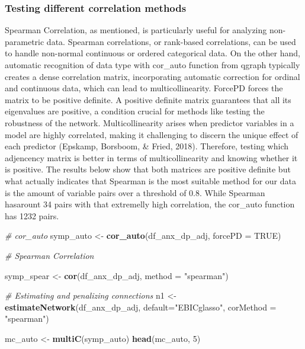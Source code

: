 \documentclass[
]{article}
\newenvironment{Shaded}{\begin{snugshade}}{\end{snugshade}}
\newcommand{\AttributeTok}[1]{\textcolor[rgb]{0.13,0.29,0.53}{#1}}
\newcommand{\CommentTok}[1]{\textcolor[rgb]{0.56,0.35,0.01}{\textit{#1}}}
\newcommand{\ConstantTok}[1]{\textcolor[rgb]{0.56,0.35,0.01}{#1}}
\newcommand{\DecValTok}[1]{\textcolor[rgb]{0.00,0.00,0.81}{#1}}
\newcommand{\FunctionTok}[1]{\textcolor[rgb]{0.13,0.29,0.53}{\textbf{#1}}}
\newcommand{\NormalTok}[1]{#1}
\newcommand{\OtherTok}[1]{\textcolor[rgb]{0.56,0.35,0.01}{#1}}
\newcommand{\StringTok}[1]{\textcolor[rgb]{0.31,0.60,0.02}{#1}}
\begin{document}
\subsubsection{Testing different correlation
methods}\label{testing-different-correlation-methods}

Spearman Correlation, as mentioned, is particularly useful for analyzing
non-parametric data. Spearman correlations, or rank-based correlations,
can be used to handle non-normal continuous or ordered categorical data.
On the other hand, automatic recognition of data type with cor\_auto
function from qgraph typically creates a dense correlation matrix,
incorporating automatic correction for ordinal and continuous data,
which can lead to multicollinearity. ForcePD forces the matrix to be
positive definite. A positive definite matrix guarantees that all its
eigenvalues are positive, a condition crucial for methods like testing
the robustness of the network. Multicollinearity arises when predictor
variables in a model are highly correlated, making it challenging to
discern the unique effect of each predictor (Epskamp, Borsboom, \&
Fried, 2018). Therefore, testing which adjencency matrix is better in
terms of multicollinearity and knowing whether it is positive. The
results below show that both matrices are positive definite but what
actually indicates that Spearman is the most suitable method for our
data is the amount of variable pairs over a threshold of 0.8. While
Spearman hasarount 34 pairs with that extremelly high correlation, the
cor\_auto function has 1232 pairs.

\begin{Shaded}
\begin{Highlighting}[]
\CommentTok{\# cor\_auto}
\NormalTok{symp\_auto }\OtherTok{\textless{}{-}} \FunctionTok{cor\_auto}\NormalTok{(df\_anx\_dp\_adj, }\AttributeTok{forcePD =} \ConstantTok{TRUE}\NormalTok{)}

\CommentTok{\# Spearman Correlation}

\NormalTok{symp\_spear }\OtherTok{\textless{}{-}} \FunctionTok{cor}\NormalTok{(df\_anx\_dp\_adj, }\AttributeTok{method =} \StringTok{"spearman"}\NormalTok{)}

\CommentTok{\# Estimating and penalizing connections}
\NormalTok{n1 }\OtherTok{\textless{}{-}} \FunctionTok{estimateNetwork}\NormalTok{(df\_anx\_dp\_adj, }\AttributeTok{default=}\StringTok{"EBICglasso"}\NormalTok{,  }\AttributeTok{corMethod =} \StringTok{"spearman"}\NormalTok{)}


\NormalTok{mc\_auto }\OtherTok{\textless{}{-}} \FunctionTok{multiC}\NormalTok{(symp\_auto)}
\FunctionTok{head}\NormalTok{(mc\_auto, }\DecValTok{5}\NormalTok{)}
\end{Highlighting}
\end{Shaded}
\end{document}
